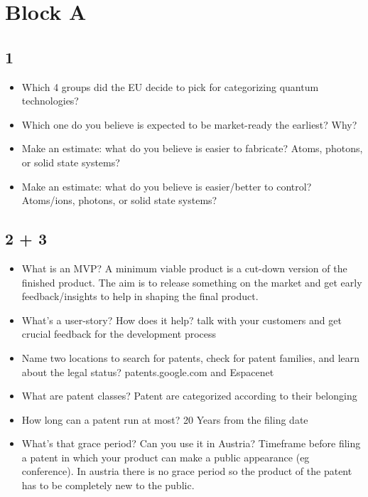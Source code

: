 \documentclass{alex_summary}
\begin{document}
	\section{Block A}
	\subsection*{1}
	\begin{itemize}
		\item Which 4 groups did the EU decide to pick for categorizing quantum technologies?
		\item Which one do you believe is expected to be market-ready the earliest? Why?
		\item Make an estimate: what do you believe is easier to fabricate? Atoms, photons, or solid state systems?
		\item Make an estimate: what do you believe is easier/better to control? Atoms/ions, photons, or solid state systems?
	\end{itemize}
		
	\subsection*{2 + 3}
	\begin{itemize}
		\item What is an MVP?
		A minimum viable product is a cut-down version of the finished product. The aim is to release something on the market and get early feedback/insights to help in shaping the final product.
		\item What’s a user-story? How does it help?
		talk with your customers and get crucial feedback for the development process
		\item Name two locations to search for patents, check for patent families, and learn about the legal status?
		patents.google.com and Espacenet
		\item What are patent classes?
		Patent are categorized according to their belonging
		\item How long can a patent run at most?
		20 Years from the filing date
		\item What’s that grace period? Can you use it in Austria?
		Timeframe before filing a patent in which your product can make a public appearance (eg conference). In austria there is no grace period so the product of the patent has to be completely new to the public.
	\end{itemize}
	
\end{document}
